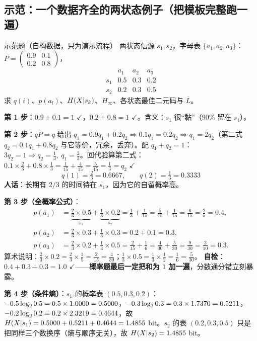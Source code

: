\documentclass[11pt,a4paper]{ctexart}
\begin{document}
\subsection{示范：一个数据齐全的两状态例子（把模板完整跑一遍）}
\begin{defbox}{示范题（自构数据，只为演示流程）}
两状态信源 $s_1,s_2$，字母表 $\{a_1,a_2,a_3\}$：
$P=\begin{pmatrix}0.9&0.1\\ 0.2&0.8\end{pmatrix}$，
\[
\begin{array}{c|ccc} & a_1&a_2&a_3\\\hline s_1 & 0.5&0.3&0.2\\ s_2 & 0.2&0.3&0.5\end{array}
\]
求 $q(i)$、$p(a_l)$、$H\!\left(X|s_k\right)$、$H_\infty$、各状态最佳二元码与 $\bar L$。
\end{defbox}

\textbf{第 1 步}：$0.9+0.1=1$ $\checkmark$，$0.2+0.8=1$ $\checkmark$。含义：$s_1$ 很“黏”（$90\%$ 留在 $s_1$）。

\textbf{第 2 步}：$qP=q$ 给出 $q_1=0.9q_1+0.2q_2\Rightarrow0.1q_1=0.2q_2\Rightarrow q_1=2q_2$（第二式 $q_2=0.1q_1+0.8q_2$ 与它等价，冗余，丢弃）。配 $q_1+q_2=1$：$3q_2=1\Rightarrow q_2=\frac13,\ q_1=\frac23$。回代验算第二式：$0.1\times\frac23+0.8\times\frac13=\frac1{15}+\frac4{15}=\frac5{15}=\frac13=q_2$ $\checkmark$
\[
\boxed{q(1)=\tfrac23=0.6667,\qquad q(2)=\tfrac13=0.3333}
\]
\textbf{人话}：长期有 $2/3$ 的时间待在 $s_1$，因为它的自留概率高。

\textbf{第 3 步（全概率公式）}：
\begin{align*}
p(a_1)&=\underbrace{\tfrac23\times0.5}_{s_1}+\underbrace{\tfrac13\times0.2}_{s_2}=\tfrac13+\tfrac1{15}=\tfrac5{15}+\tfrac1{15}=\tfrac6{15}=\tfrac25=0.4,\\
p(a_2)&=\tfrac23\times0.3+\tfrac13\times0.3=0.2+0.1=0.3,\\
p(a_3)&=\tfrac23\times0.2+\tfrac13\times0.5=\tfrac2{15}+\tfrac16=\tfrac4{30}+\tfrac5{30}=\tfrac9{30}=\tfrac3{10}=0.3 .
\end{align*}
算术说明：$\frac23\times0.2=\frac23\times\frac15=\frac2{15}=\frac4{30}$；$\frac13\times0.5=\frac13\times\frac12=\frac16=\frac5{30}$。
\textbf{自检}：$0.4+0.3+0.3=1.0$ $\checkmark$——\textbf{概率题最后一定把和为 $1$ 加一遍}，分数通分错立刻暴露。

\textbf{第 4 步（条件熵）}：$s_1$ 的概率表 $(0.5,0.3,0.2)$：
$-0.5\log_{2}0.5=0.5\times1.0000=0.5000$，$-0.3\log_{2}0.3=0.3\times1.7370=0.5211$，$-0.2\log_{2}0.2=0.2\times2.3219=0.4644$，故
$H\!\left(X|s_1\right)=0.5000+0.5211+0.4644=1.4855$ bit。$s_2$ 的表 $(0.2,0.3,0.5)$ 只是把同样三个数换序（熵与顺序无关），故 $H\!\left(X|s_2\right)=1.4855$ bit。
\end{document}
